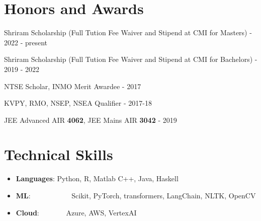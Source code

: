 \documentclass[a4paper,20pt]{article}
\newcommand{\resumeItem}[2]{
  \item\small{
    \textbf{#1}{: #2 \vspace{-2pt}}
  }
}
\newcommand{\resumeSubItem}[2]{\resumeItem{#1}{#2}\vspace{-3pt}}
\newcommand{\resumeSubHeadingListStart}{\begin{itemize}[leftmargin=*]}
\newcommand{\resumeSubHeadingListEnd}{\end{itemize}}
\begin{document}
\vspace{-5pt}
\section{Honors and Awards}
\begin{description}[font=$\bullet$]
\item {Shriram Scholarship (Full Tution Fee Waiver and Stipend at CMI for Masters) - 2022 - present}
\vspace{-5pt}
\item {Shriram Scholarship (Full Tution Fee Waiver and Stipend at CMI for Bachelors) - 2019 - 2022}
\vspace{-5pt}
\item {NTSE Scholar, INMO Merit Awardee - 2017}
\vspace{-5pt}
\item {KVPY, RMO, NSEP, NSEA Qualifier - 2017-18}
\vspace{-5pt}
\item {JEE Advanced AIR \textbf{4062}, JEE Mains AIR \textbf{3042}  - 2019}

\end{description}
\vspace{-5pt}

\vspace{-5pt}
\section{Technical Skills}
	\resumeSubHeadingListStart
	\resumeSubItem{Languages}{Python, R, Matlab C++, Java, Haskell}
	\resumeSubItem{ML}{~~~~~~~~~~~Scikit, PyTorch, transformers, LangChain, NLTK, OpenCV}
  \resumeSubItem{Cloud}{~~~~~~~Azure, AWS, VertexAI}

\resumeSubHeadingListEnd
\vspace{-5pt}






\begin{comment}
\vspace{-5pt}
\section{Publications}
\resumeSubHeadingListStart
\resumeSubItem{Book: Deep Learning on Web (Web Development, Deep Learning)}{Work in Progress book to be published by Packt Publishing in late 2019. Tech: Django, Python, AWS, GCP, Azure (November '18)}
\vspace{2pt}
\resumeSubItem{Book: Deep Learning on Mobile Devices (Flutter App Development, Deep Learning)}{Work in Progress book to be published by Packt Publishing in late 2019. Tech: Flutter, Android, Firebase, TensorFlow, Python, Dart (December '18)}
\resumeSubHeadingListEnd
\end{comment}
\end{document}
